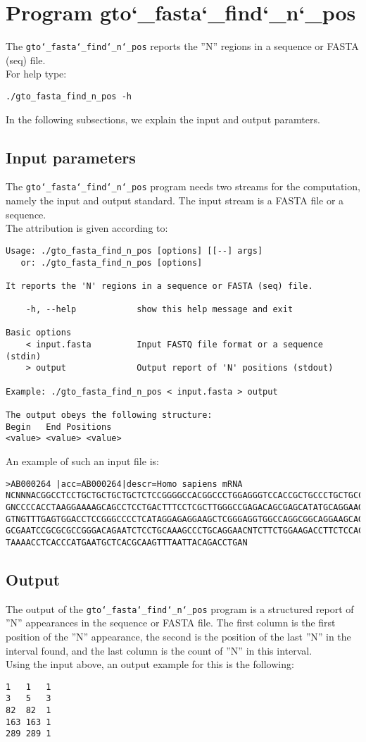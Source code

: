 \section{Program gto\char`_fasta\char`_find\char`_n\char`_pos}
The \texttt{gto\char`_fasta\char`_find\char`_n\char`_pos} reports the ''N'' regions in a sequence or FASTA (seq) file.\\
For help type:
\begin{lstlisting}
./gto_fasta_find_n_pos -h
\end{lstlisting}
In the following subsections, we explain the input and output paramters.

\subsection*{Input parameters}

The \texttt{gto\char`_fasta\char`_find\char`_n\char`_pos} program needs two streams for the computation, namely the input and output standard. The input stream is a FASTA file or a sequence.\\
The attribution is given according to:
\begin{lstlisting}
Usage: ./gto_fasta_find_n_pos [options] [[--] args]
   or: ./gto_fasta_find_n_pos [options]

It reports the 'N' regions in a sequence or FASTA (seq) file.

    -h, --help            show this help message and exit

Basic options
    < input.fasta         Input FASTQ file format or a sequence (stdin)
    > output              Output report of 'N' positions (stdout)

Example: ./gto_fasta_find_n_pos < input.fasta > output

The output obeys the following structure:
Begin	End	Positions
<value>	<value>	<value>
\end{lstlisting}
An example of such an input file is:
\begin{lstlisting}
>AB000264 |acc=AB000264|descr=Homo sapiens mRNA 
NCNNNACGGCCTCCTGCTGCTGCTGCTCTCCGGGGCCACGGCCCTGGAGGGTCCACCGCTGCCCTGCTGCCATTGTCCCC
GNCCCCACCTAAGGAAAAGCAGCCTCCTGACTTTCCTCGCTTGGGCCGAGACAGCGAGCATATGCAGGAAGCGGCAGGAA
GTNGTTTGAGTGGACCTCCGGGCCCCTCATAGGAGAGGAAGCTCGGGAGGTGGCCAGGCGGCAGGAAGCAGGCCAGTGCC
GCGAATCCGCGCGCCGGGACAGAATCTCCTGCAAAGCCCTGCAGGAACNTCTTCTGGAAGACCTTCTCCACCCCCCCAGC
TAAAACCTCACCCATGAATGCTCACGCAAGTTTAATTACAGACCTGAN
\end{lstlisting}

\subsection*{Output}
The output of the \texttt{gto\char`_fasta\char`_find\char`_n\char`_pos} program is a structured report of ''N'' appearances in the sequence or FASTA file. The first column is the first position of the ''N'' appearance, the second is the position of the last ''N'' in the interval found, and the last column is the count of ''N'' in this interval. \\
Using the input above, an output example for this is the following:
\begin{lstlisting}
1	1	1
3	5	3
82	82	1
163	163	1
289	289	1
\end{lstlisting}
